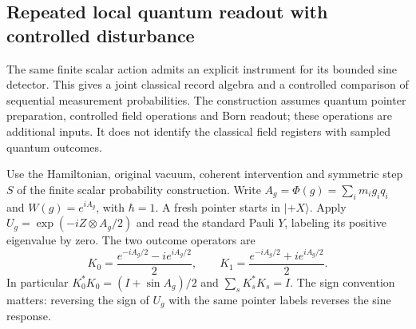 \subsection{Repeated local quantum readout with controlled disturbance}
\label{sec:source-scalar-sequential-instrument}

The same finite scalar action admits an explicit instrument for its bounded
sine detector. This gives a joint classical record algebra and a controlled
comparison of sequential measurement probabilities. The construction assumes
quantum pointer preparation, controlled field operations and Born readout;
these operations are additional inputs. It does not identify the classical
field registers with sampled quantum outcomes.

Use the Hamiltonian, original vacuum, coherent intervention and symmetric
step $S$ of the finite scalar probability construction. Write
$A_g=\Phi(g)=\sum_i m_i g_i q_i$ and $W(g)=e^{iA_g}$, with $\hbar=1$.
A fresh pointer starts in $|+X\rangle$. Apply
$U_g=\exp(-iZ\otimes A_g/2)$ and read the standard Pauli $Y$, labeling
its positive eigenvalue by zero. The two outcome operators are
\[
 K_0=\frac{e^{-iA_g/2}-i e^{iA_g/2}}2,\qquad
 K_1=\frac{e^{-iA_g/2}+i e^{iA_g/2}}2.
\]
In particular $K_0^*K_0=(I+\sin A_g)/2$ and
$\sum_sK_s^*K_s=I$. The sign convention matters: reversing the sign
of $U_g$ with the same pointer labels reverses the sine response.

